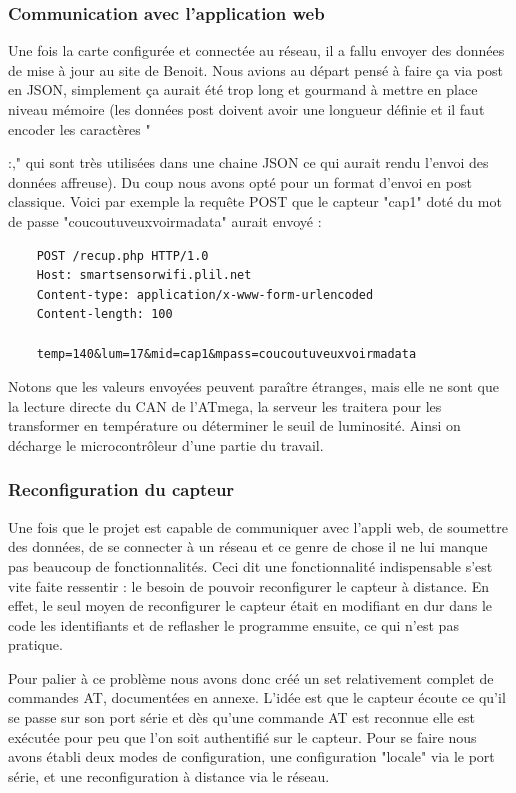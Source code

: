 		\subsubsection{Communication avec l'application web}
		Une fois la carte configurée et connectée au réseau, il a fallu envoyer des données de mise à jour au
		site de Benoit. Nous avions au départ pensé à faire ça via post en JSON, simplement ça aurait
		été trop long et gourmand à mettre en place niveau mémoire (les données post doivent avoir
		une longueur définie et il faut encoder les caractères "{:," qui sont très utilisées dans une
		chaine JSON ce qui aurait rendu l'envoi des données affreuse). Du coup nous avons opté pour un
		format d'envoi en post classique. Voici par exemple la requête POST que le capteur "cap1" doté du mot de passe
		"coucoutuveuxvoirmadata" aurait envoyé :
		
		\begin{verbatim}
    POST /recup.php HTTP/1.0
    Host: smartsensorwifi.plil.net
    Content-type: application/x-www-form-urlencoded
    Content-length: 100
    
    temp=140&lum=17&mid=cap1&mpass=coucoutuveuxvoirmadata
		\end{verbatim}
		
		\par Notons que les valeurs envoyées peuvent paraître étranges, mais elle ne sont que la lecture
		directe du CAN de l'ATmega, la serveur les traitera pour les transformer en température ou
		déterminer le seuil de luminosité. Ainsi on décharge le microcontrôleur d'une partie
		du travail.
		
		\subsubsection{Reconfiguration du capteur}
		Une fois que le projet est capable de communiquer avec l'appli web, de soumettre
		des données, de se connecter à un réseau et ce genre de chose il ne lui manque pas beaucoup de fonctionnalités.
		Ceci dit une fonctionnalité indispensable s'est vite faite ressentir :
		le besoin de pouvoir reconfigurer le capteur à distance. En effet, le
		seul moyen de reconfigurer le capteur était en modifiant en dur dans le code les identifiants et
		de reflasher le programme ensuite, ce qui n'est pas pratique.

		Pour palier à ce problème nous avons donc créé un set relativement complet de commandes AT,
		documentées en annexe. L'idée est que le capteur écoute ce qu'il se passe sur son port série
		et dès qu'une commande AT est reconnue elle est exécutée pour peu que l'on soit authentifié sur
		le capteur. Pour se faire nous avons établi deux modes de configuration, une configuration "locale" via
		le port série, et une reconfiguration à distance via le réseau. 
		
}
